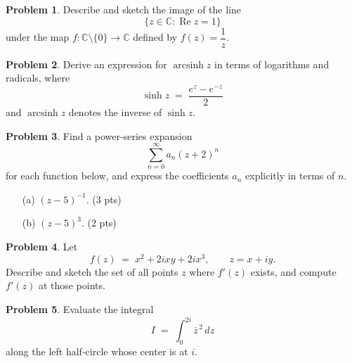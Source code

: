 \documentclass[10pt]{article}
\theoremstyle{definition} %
\newtheorem{problem}{Problem}
\theoremstyle{plain} %
\begin{document}
                        \begin{problem}
                        Describe and sketch the image of the line
                        \[
                          \bigl\{z\in\mathbb{C} : \operatorname{Re}z = 1\bigr\}
                        \]
                        under the map \(f:\mathbb{C}\setminus\{0\}\to\mathbb{C}\) defined by \(f(z)=\dfrac{1}{z}\).
                        \end{problem}
                        
                        \begin{problem}
                        Derive an expression for \(\operatorname{arcsinh} z\) in terms of logarithms and radicals, where
                        \[
                          \sinh z \;=\; \frac{e^{z}-e^{-z}}{2}
                        \]
                        and \(\operatorname{arcsinh} z\) denotes the inverse of \(\sinh z\).
                        \end{problem}
                        
                        \begin{problem}
                        Find a power‑series expansion
                        \[
                          \sum_{n=0}^{\infty} a_{n}(z+2)^{n}
                        \]
                        for each function below, and express the coefficients \(a_{n}\) explicitly in terms of \(n\).
                        \begin{enumerate}\itemsep4pt
                          \item[(a)] \(\displaystyle (z-5)^{-1}\). \hfill (3 pts)
                          \item[(b)] \(\displaystyle (z-5)^{3}\). \hfill (2 pts)
                        \end{enumerate}
                        \end{problem}
                        
                        \begin{problem}
                        Let
                        \[
                          f(z) \;=\; x^{2} + 2ixy + 2ix^{3}, \qquad z = x + iy.
                        \]
                        Describe and sketch the set of all points \(z\) where \(f'(z)\) exists, and compute \(f'(z)\) at those points.
                        \end{problem}
                        \begin{problem}
                          Evaluate the integral
                          \[
                            I \;=\; \int_{0}^{2i} \overline{z}^{\,2}\,dz
                          \]
                          along the left half‑circle whose center is at \(i\).
                          \end{problem}
                          
\end{document}

